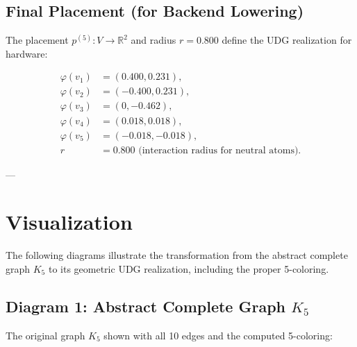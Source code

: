 \documentclass[11pt]{article}
\theoremstyle{definition}
\newcommand{\Real}{\mathbb{R}}
\begin{document}
\subsection{Final Placement (for Backend Lowering)}

The placement $p^{(5)} : V \to \Real^2$ and radius $r = 0.800$ define the UDG realization for hardware:

\begin{align*}
\varphi(v_1) &= (0.400, 0.231),\\
\varphi(v_2) &= (-0.400, 0.231),\\
\varphi(v_3) &= (0, -0.462),\\
\varphi(v_4) &= (0.018, 0.018),\\
\varphi(v_5) &= (-0.018, -0.018),\\
r &= 0.800 \text{ (interaction radius for neutral atoms)}.
\end{align*}

---

\section{Visualization}

The following diagrams illustrate the transformation from the abstract complete graph $K_5$ to its geometric UDG realization, including the proper 5-coloring.

\subsection*{Diagram 1: Abstract Complete Graph $K_5$}

The original graph $K_5$ shown with all 10 edges and the computed 5-coloring:

\begin{center}
\end{center}
\end{document}
